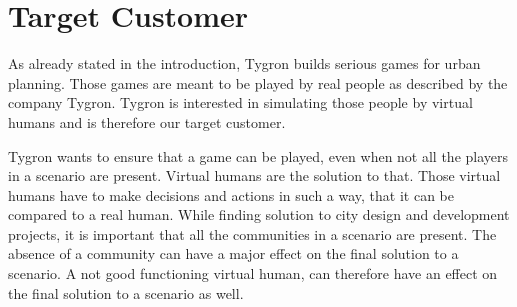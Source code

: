 \section{Target Customer}
As already stated in the introduction, Tygron builds serious games for urban planning. Those games are meant to be played by real people as described by the company Tygron\cite{tygron}. Tygron is interested in simulating those people by virtual humans and is therefore our target customer.
\par
Tygron wants to ensure that a game can be played, even when not all the players in a scenario are present. Virtual humans are the solution to that. Those virtual humans have to make decisions and actions in such a way, that it can be compared to a real human. While finding solution to city design and development projects, it is important that all the communities in a scenario are present. The absence of a community can have a major effect on the final solution to a scenario. A not good functioning virtual human, can therefore have an effect on the final solution to a scenario as well. 